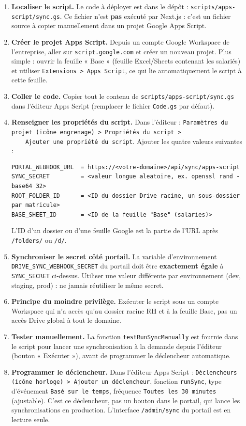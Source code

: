 \documentclass[10.5pt,a4paper]{article}
\newcommand{\mono}[1]{{\ttfamily\nolinkurl{#1}}}
\begin{document}
\begin{enumerate}[leftmargin=1.5em, itemsep=0.4em, topsep=0.3em]
  \item \textbf{Localiser le script.} Le code à déployer est dans le dépôt :
    \mono{scripts/apps-script/sync.gs}. Ce fichier n'est \textbf{pas} exécuté
    par Next.js : c'est un fichier source à copier manuellement dans un
    projet Google Apps Script.
  \item \textbf{Créer le projet Apps Script.} Depuis un compte Google
    Workspace de l'entreprise, aller sur \mono{script.google.com} et créer un
    nouveau projet. Plus simple : ouvrir la feuille « Base » (feuille
    Excel/Sheets contenant les salariés) et utiliser
    \mono{Extensions > Apps Script}, ce qui lie automatiquement le script à
    cette feuille.
  \item \textbf{Coller le code.} Copier tout le contenu de
    \mono{scripts/apps-script/sync.gs} dans l'éditeur Apps Script (remplacer
    le fichier \mono{Code.gs} par défaut).
  \item \textbf{Renseigner les propriétés du script.} Dans l'éditeur :
    \mono{Paramètres du projet (icône engrenage) > Propriétés du script >
    Ajouter une propriété du script}. Ajouter les quatre valeurs suivantes :
\begin{lstlisting}
PORTAL_WEBHOOK_URL  = https://<votre-domaine>/api/sync/apps-script
SYNC_SECRET         = <valeur longue aleatoire, ex. openssl rand -base64 32>
ROOT_FOLDER_ID      = <ID du dossier Drive racine, un sous-dossier par matricule>
BASE_SHEET_ID       = <ID de la feuille "Base" (salaries)>
\end{lstlisting}
    L'ID d'un dossier ou d'une feuille Google est la partie de l'URL après
    \mono{/folders/} ou \mono{/d/}.
  \item \textbf{Synchroniser le secret côté portail.} La variable
    d'environnement \mono{DRIVE\_SYNC\_WEBHOOK\_SECRET} du portail doit être
    \textbf{exactement égale} à \mono{SYNC\_SECRET} ci-dessus. Utiliser une
    valeur différente par environnement (dev, staging, prod) : ne jamais
    réutiliser le même secret.
  \item \textbf{Principe du moindre privilège.} Exécuter le script sous un
    compte Workspace qui n'a accès qu'au dossier racine RH et à la feuille
    Base, pas un accès Drive global à tout le domaine.
  \item \textbf{Tester manuellement.} La fonction \mono{testRunSyncManually}
    est fournie dans le script pour lancer une synchronisation à la demande
    depuis l'éditeur (bouton « Exécuter »), avant de programmer le
    déclencheur automatique.
  \item \textbf{Programmer le déclencheur.} Dans l'éditeur Apps Script :
    \mono{Déclencheurs (icône horloge) > Ajouter un déclencheur}, fonction
    \mono{runSync}, type d'événement \mono{Basé sur le temps}, fréquence
    \mono{Toutes les 30 minutes} (ajustable). C'est ce déclencheur, pas un
    bouton dans le portail, qui lance les synchronisations en production.
    L'interface \mono{/admin/sync} du portail est en lecture seule.
\end{enumerate}
\end{document}
